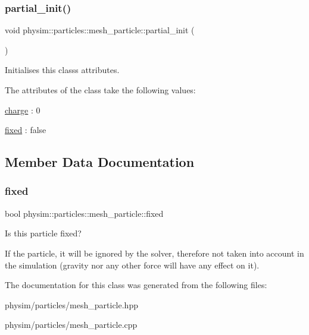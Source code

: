 \subsubsection{\texorpdfstring{partial\+\_\+init()}{partial\_init()}}
{\footnotesize\ttfamily void physim\+::particles\+::mesh\+\_\+particle\+::partial\+\_\+init (\begin{DoxyParamCaption}{ }\end{DoxyParamCaption})\hspace{0.3cm}{\ttfamily [private]}}



Initialises this class\textquotesingle{}s attributes. 

The attributes of the class take the following values\+:
\begin{DoxyItemize}
\item \hyperlink{classphysim_1_1particles_1_1mesh__particle_adf14d64e9effa2bcf5cb84a537bd8027}{charge} \+: 0
\item \hyperlink{classphysim_1_1particles_1_1mesh__particle_a5813a57507d8a3539a1534dfd1b74883}{fixed} \+: false 
\end{DoxyItemize}

\subsection{Member Data Documentation}
\mbox{\label{classphysim_1_1particles_1_1mesh__particle_a5813a57507d8a3539a1534dfd1b74883}} 
\subsubsection{\texorpdfstring{fixed}{fixed}}
{\footnotesize\ttfamily bool physim\+::particles\+::mesh\+\_\+particle\+::fixed}



Is this particle fixed? 

If the particle, it will be ignored by the solver, therefore not taken into account in the simulation (gravity nor any other force will have any effect on it). 

The documentation for this class was generated from the following files\+:\begin{DoxyCompactItemize}
\item 
physim/particles/mesh\+\_\+particle.\+hpp\item 
physim/particles/mesh\+\_\+particle.\+cpp\end{DoxyCompactItemize}
